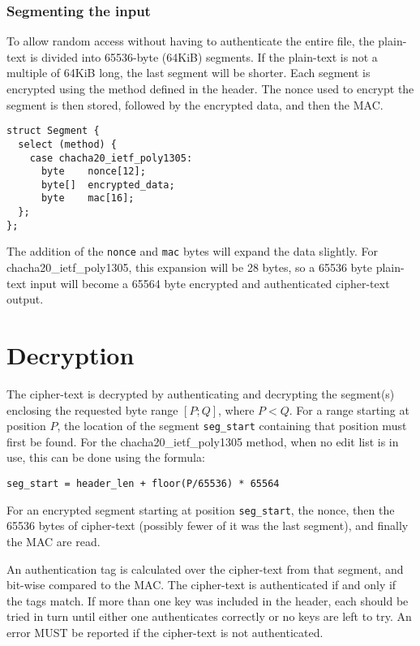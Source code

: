 \documentclass[10pt]{article}
\newcommand{\kw}[1]{\texttt{#1}}
\begin{document}
\subsubsection{Segmenting the input}

To allow random access without having to authenticate the entire file, the plain-text is divided into 65536-byte
(64KiB) segments.
If the plain-text is not a multiple of 64KiB long, the last segment will be shorter.
Each segment is encrypted using the method defined in the header.
The nonce used to encrypt the segment is then stored, followed by the encrypted data, and then the MAC.

\begin{verbatim}
struct Segment {
  select (method) {
    case chacha20_ietf_poly1305:
      byte    nonce[12];
      byte[]  encrypted_data;
      byte    mac[16];
  };
};
\end{verbatim}

The addition of the \kw{nonce} and \kw{mac} bytes will expand the data slightly.
For chacha20\_ietf\_poly1305, this expansion will be 28 bytes, so a 65536 byte plain-text input will become a 65564
byte encrypted and authenticated cipher-text output.

\section{Decryption}

The cipher-text is decrypted by authenticating and decrypting the segment(s) enclosing the requested byte range $[P;Q]$,
where $P<Q$.
For a range starting at position $P$, the location of the segment \kw{seg\_start} containing that position must
first be found.
For the chacha20\_ietf\_poly1305 method, when no edit list is in use, this can be done using the formula:

\begin{verbatim}
seg_start = header_len + floor(P/65536) * 65564
\end{verbatim}

For an encrypted segment starting at position \kw{seg\_start}, the nonce, then the 65536 bytes of cipher-text
(possibly fewer of it was the last segment), and finally the MAC are read.

An authentication tag is calculated over the cipher-text from that segment, and bit-wise compared to the MAC.
The cipher-text is authenticated if and only if the tags match.
If more than one key was included in the header, each should be tried in turn until either one authenticates
correctly or no keys are left to try.
An error MUST be reported if the cipher-text is not authenticated.
\end{document}
